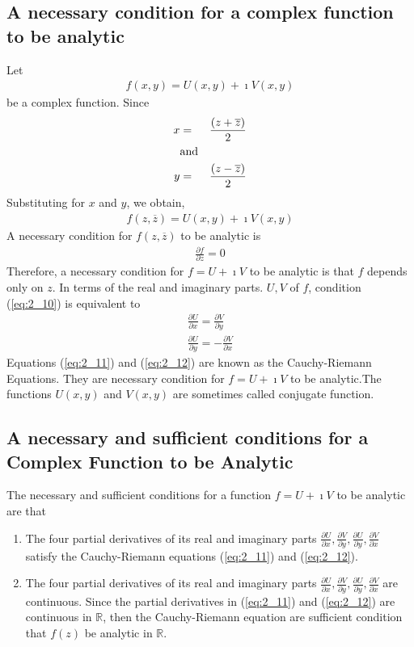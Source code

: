 \documentclass[11pt]{report}
\newcommand{\sps}{\\[0.2cm]}
\newcommand{\refn}[1]{(\ref{#1})}
\newcommand{\refx}[1]{\refn{eq:#1}}
\newcommand{\zbar}{\overline{z}}
\newcommand{\dsp}{\displaystyle}
\newcommand{\real}{ \mathbb{R}}
\newcommand{\imaginary}{\imath}
\begin{document}
	\subsection{A necessary condition for a complex function to be analytic}
	Let 
	\begin{eqnarray}
		f(x,y) = U(x,y) + \imaginary V(x,y)
	\end{eqnarray}
	be a complex function. Since
	\begin{eqnarray}
		x&=&\frac{(z+\zbar)}{2}\\
		&\text{and}\notag\\
		y&=&\frac{(z-\zbar)}{2}
	\end{eqnarray}
	Substituting for $x$ and $y$, we obtain,
	\begin{eqnarray}
		f(z,\zbar) = U(x,y) + \imaginary V(x,y)
	\end{eqnarray}
	A necessary condition for $f(z,\zbar)$ to be analytic is
	\begin{eqnarray}
		\frac{\partial f}{\partial z} = 0\label{eq:2_10}
	\end{eqnarray}
	Therefore, a necessary condition for $f=U+\imaginary V$ to be analytic is that $f$ depends only on $z$. In terms of the real and imaginary parts. $U,V$ of $f$, condition \refx{2_10} is equivalent to 
	\begin{eqnarray}
		\frac{\partial U}{\partial x} = \frac{\partial V}{\partial y}\label{eq:2_11}\sps
		\frac{\partial U}{\partial y} = -\frac{\partial V}{\partial x}\label{eq:2_12}
	\end{eqnarray}
	Equations \refx{2_11} and \refx{2_12} are known as the Cauchy-Riemann Equations. They are necessary condition for $f=U+\imaginary V$ to be analytic.The functions $U(x,y)$ and $V(x,y)$ are sometimes called conjugate function.
	
	\subsection{A necessary and sufficient conditions for a Complex Function to be Analytic}
	The necessary and sufficient conditions for a function $f=U+\imaginary V$ to be analytic are that
	\begin{enumerate}
		\item The four partial derivatives of its real and imaginary parts $\dsp\frac{\partial U}{\partial x},\frac{\partial V}{\partial y}, \frac{\partial U}{\partial y}, \frac{\partial V}{\partial x}$ satisfy the Cauchy-Riemann equations \refx{2_11} and \refx{2_12}.
		\item The four partial derivatives of its real and imaginary parts $\dsp\frac{\partial U}{\partial x},\frac{\partial V}{\partial y}, \frac{\partial U}{\partial y}, \frac{\partial V}{\partial x}$ are continuous. Since the partial derivatives in \refx{2_11} and \refx{2_12} are continuous in $\real$, then the Cauchy-Riemann equation are sufficient condition that $f(z)$ be analytic in $\real$.
	\end{enumerate}
	
\end{document}
